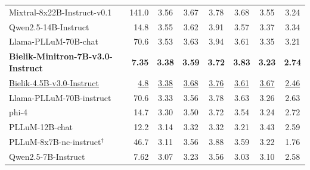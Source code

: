 \documentclass{article}
\begin{document}
\begin{table}[t]
\begin{tabular}{lrcccccc}
    Mixtral-8x22B-Instruct-v0.1 & 141.0 & 3.56 & 3.67 & 3.78 & 3.68 & 3.55 & 3.24 \\
    Qwen2.5-14B-Instruct & 14.8 & 3.55 & 3.62 & 3.91 & 3.57 & 3.37 & 3.34 \\
    Llama-PLLuM-70B-chat & 70.6 & 3.53 & 3.63 & 3.94 & 3.61 & 3.35 & 3.21 \\
    \textbf{Bielik-Minitron-7B-v3.0-Instruct} & \textbf{7.35} & \textbf{3.38} & \textbf{3.59} & \textbf{3.72} & \textbf{3.83} & \textbf{3.23} & \textbf{2.74} \\
    \underline{Bielik-4.5B-v3.0-Instruct} & \underline{4.8} & \underline{3.38} & \underline{3.68} & \underline{3.76} & \underline{3.61} & \underline{3.67} & \underline{2.46} \\
    Llama-PLLuM-70B-instruct & 70.6 & 3.33 & 3.56 & 3.78 & 3.63 & 3.26 & 2.63 \\
    phi-4 & 14.7 & 3.30 & 3.50 & 3.72 & 3.54 & 3.24 & 2.72 \\
    PLLuM-12B-chat & 12.2 & 3.14 & 3.32 & 3.32 & 3.21 & 3.43 & 2.59 \\
    PLLuM-8x7B-nc-instruct$^{\dagger}$ & 46.7 & 3.11 & 3.56 & 3.88 & 3.59 & 3.22 & 1.76 \\
    Qwen2.5-7B-Instruct & 7.62 & 3.07 & 3.23 & 3.56 & 3.03 & 3.10 & 2.58 \\

\end{tabular}
\end{table}
\end{document}

